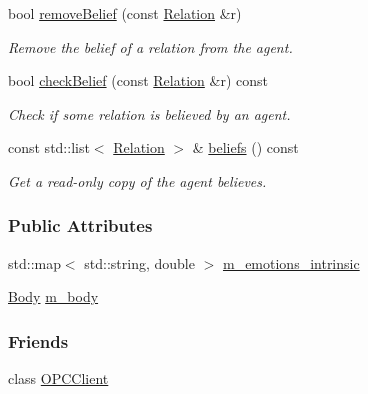 \begin{DoxyCompactItemize}
bool \hyperlink{group__icubclient__representations_a88a72b25c0e87ea6048416d20fb79ae5}{remove\+Belief} (const \hyperlink{group__icubclient__representations_classicubclient_1_1Relation}{Relation} \&r)
\begin{DoxyCompactList}\small\item\em Remove the belief of a relation from the agent. \end{DoxyCompactList}\item 
bool \hyperlink{group__icubclient__representations_aecc3b845c448a87061534928d125f1e4}{check\+Belief} (const \hyperlink{group__icubclient__representations_classicubclient_1_1Relation}{Relation} \&r) const
\begin{DoxyCompactList}\small\item\em Check if some relation is believed by an agent. \end{DoxyCompactList}\item 
const std\+::list$<$ \hyperlink{group__icubclient__representations_classicubclient_1_1Relation}{Relation} $>$ \& \hyperlink{group__icubclient__representations_ae17b4238ba14a8a0b19a238a333d6472}{beliefs} () const
\begin{DoxyCompactList}\small\item\em Get a read-\/only copy of the agent believes. \end{DoxyCompactList}\end{DoxyCompactItemize}
\subsubsection*{Public Attributes}
\begin{DoxyCompactItemize}
\item 
std\+::map$<$ std\+::string, double $>$ \hyperlink{group__icubclient__representations_a714610cafc5f7b7942badedd056ae87e}{m\+\_\+emotions\+\_\+intrinsic}
\item 
\hyperlink{group__icubclient__representations_structicubclient_1_1Body}{Body} \hyperlink{group__icubclient__representations_a6ab805862ead5247cd5cbd99f5c6da76}{m\+\_\+body}
\end{DoxyCompactItemize}
\subsubsection*{Friends}
\begin{DoxyCompactItemize}
\item 
class \hyperlink{group__icubclient__representations_a80f0caa9925206967111a3d2713874a2}{O\+P\+C\+Client}
\end{DoxyCompactItemize}
